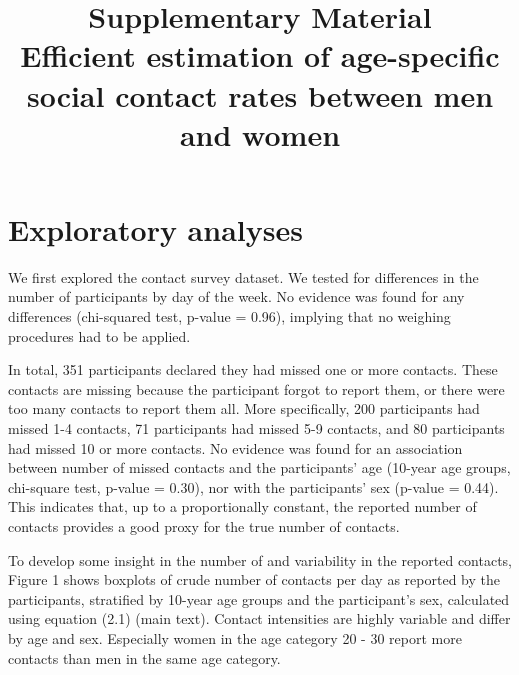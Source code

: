 \documentclass[aoas,preprint]{imsart}
\numberwithin{equation}{section}
\begin{document}
\begin{frontmatter}
\title{Supplementary Material\\Efficient estimation of age-specific social contact rates between men and women}
\end{frontmatter}

\section{Exploratory analyses}

We first explored the contact survey dataset. We tested for differences in the number of participants by day of the week. No evidence was found for any differences (chi-squared test, p-value = 0.96), implying that no weighing procedures had to be applied.

In total, 351 participants declared they had missed one or more contacts. These contacts are missing because the participant forgot to report them, or there were too many contacts to report them all. More specifically, 200 participants had missed 1-4 contacts, 71 participants had missed 5-9 contacts, and 80 participants had missed 10 or more contacts. No evidence was found for an association between number of missed contacts and the participants' age (10-year age groups, chi-square test, p-value = 0.30), nor with the participants' sex (p-value = 0.44). This indicates that, up to a proportionally constant, the reported number of contacts provides a good proxy for the true number of contacts.

To develop some insight in the number of and variability in the reported contacts, Figure 1 shows boxplots of crude number of contacts per day as reported by the participants, stratified by 10-year age groups and the participant's sex, calculated using equation (2.1) (main text). Contact intensities are highly variable and differ by age and sex. Especially women in the age category 20 - 30 report more contacts than men in 
the same age category.
\end{document}
